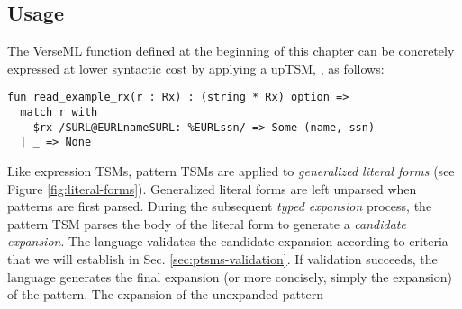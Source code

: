 \subsection{Usage}\label{sec:ptsms-usage}
The VerseML function  defined at the beginning of this chapter can be concretely expressed at lower syntactic cost by applying a upTSM, , as follows:
\begin{lstlisting}
fun read_example_rx(r : Rx) : (string * Rx) option => 
  match r with 
    $rx /SURL@EURLnameSURL: %EURLssn/ => Some (name, ssn)
  | _ => None
\end{lstlisting}
Like expression TSMs, pattern TSMs are applied to \emph{generalized literal forms} (see Figure \ref{fig:literal-forms}). Generalized literal forms are left unparsed when patterns are first parsed. During the subsequent \emph{typed expansion} process, the pattern TSM parses the body of the literal form to generate a \emph{candidate expansion}. The language validates the candidate expansion according to criteria that we will establish in Sec. \ref{sec:ptsms-validation}. If validation succeeds, the language generates the final expansion (or more concisely, simply the expansion) of the pattern. The expansion of the unexpanded pattern \li{#\dolla#rx /SURL@EURLnameSURL: %
\begin{lstlisting}[numbers=none]
Seq(Str(name), Seq(Str "SSTR: ESTR", ssn))
\end{lstlisting}

The checks for exhaustiveness and redundancy can be performed post-expansion in the usual way, so we do not need to consider them further here. 
}
